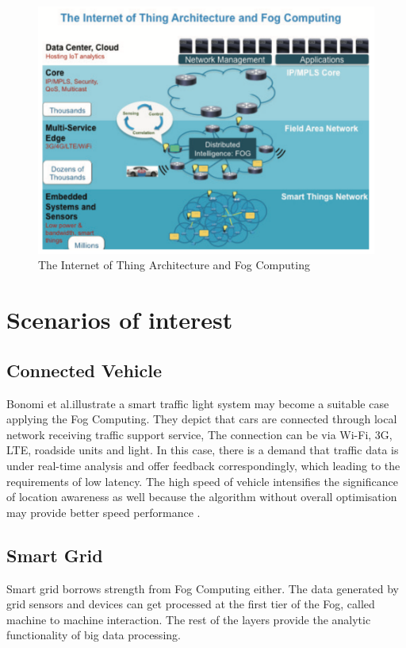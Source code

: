 \begin{figure}
    \centering
    \includegraphics[width=\textwidth]{images/the_internet_of_thing_architecture_and_fog_computing.png}
    \caption{The Internet of Thing Architecture and Fog Computing}
    \label{fig:the_internet_of_thing_architecture_and_fog_computing}
\end{figure}

\section{Scenarios of interest}

\subsection{Connected Vehicle}
Bonomi et al.illustrate a smart traffic light system may become a suitable case applying the Fog Computing. They depict that cars are connected through local network receiving traffic support service, The connection can be via Wi-Fi, 3G, LTE, roadside units and light. In this case, there is a demand that traffic data is under real-time analysis and offer feedback correspondingly, which leading to the requirements of low latency. The high speed of vehicle intensifies the significance of location awareness as well because the algorithm without overall optimisation may provide better speed performance \cite{bonomi2012fog}.

\subsection{Smart Grid}
Smart grid borrows strength from Fog Computing either. The data generated by grid sensors and devices can get processed at the first tier of the Fog, called machine to machine interaction. The rest of the layers provide the analytic functionality of big data processing. 

